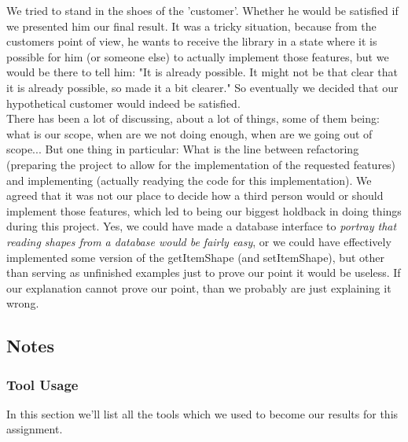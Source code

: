 \documentclass{article}
\begin{document}
We tried to stand in the shoes of the 'customer'. Whether he would be satisfied if we presented him our final result. It was a tricky situation, because from the customers point of view, he wants to receive the library in a state where it is possible for him (or someone else) to actually implement those features, but we would be there to tell him: "It is already possible. It might not be that clear that it is already possible, so made it a bit clearer." So eventually we decided that our hypothetical customer would indeed be satisfied.\\

There has been a lot of discussing, about a lot of things, some of them being: what is our scope, when are we not doing enough, when are we going out of scope... But one thing in particular: What is the line between refactoring (preparing the project to allow for the implementation of the requested features) and implementing (actually readying the code for this implementation). We agreed that it was not our place to decide how a third person would or should implement those features, which led to being our biggest holdback in  doing things during this project. Yes, we could have made a database interface to \textit{portray that reading shapes from a database would be fairly easy}, or we could have effectively implemented some version of the getItemShape (and setItemShape), but other than serving as unfinished examples just to prove our point it would be useless. If our explanation cannot prove our point, than we probably are just explaining it wrong.

\subsection{Notes}

\subsubsection{Tool Usage}

In this section we'll list all the tools which we used to become our results for this assignment.
\end{document}
